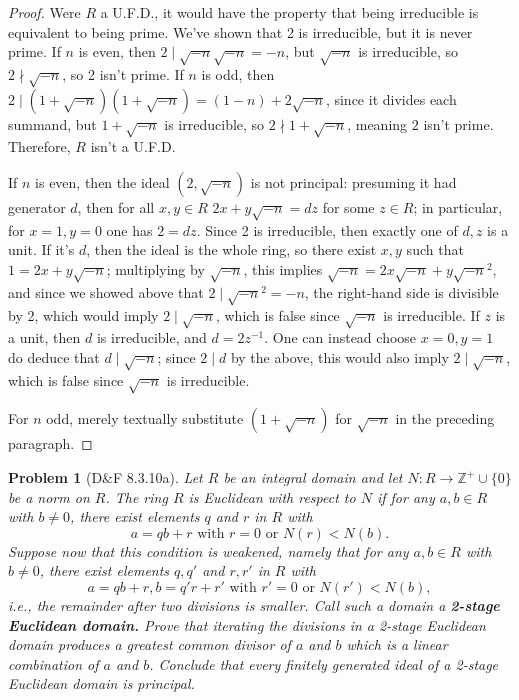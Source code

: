 \documentclass{article}
\newtheorem{plm}{Problem}
\begin{document}
\begin{proof}
  Were $R$ a U.F.D., it would have the property that being irreducible is equivalent to being prime.
  We've shown that 2 is irreducible, but it is never prime.
  If $n$ is even, then $2 \mid \sqrt{-n}\sqrt{-n} = -n$, but $\sqrt{-n}$ is irreducible, so $2 \nmid \sqrt{-n}$, so 2 isn't prime.
  If $n$ is odd, then $2 \mid (1 + \sqrt{-n})(1 + \sqrt{-n}) = (1 - n) + 2\sqrt{-n}$, since it divides each summand,
  but $1 + \sqrt{-n}$ is irreducible, so $2 \nmid 1 + \sqrt{-n}$, meaning $2$ isn't prime.
  Therefore, $R$ isn't a U.F.D.

  If $n$ is even, then
  the ideal $(2, \sqrt{-n})$ is not principal: presuming it had generator $d$, then for all $x, y \in R$ $2x + y\sqrt{-n} = dz$ for some $z \in R$;
  in particular, for $x = 1, y = 0$ one has $2 = dz$.
  Since 2 is irreducible, then exactly one of $d, z$ is a unit.
  If it's $d$, then the ideal is the whole ring, so there exist $x, y$ such that $1 = 2x + y\sqrt{-n}$; multiplying by $\sqrt{-n}$, this implies
  $\sqrt{-n} = 2x\sqrt{-n} + y \sqrt{-n}^{2}$, and since we showed above that $2 \mid \sqrt{-n}^{2} = -n$,
  the right-hand side is divisible by 2, which would imply $2 \mid \sqrt{-n}$, which is false since $\sqrt{-n}$ is  irreducible.
  If $z$ is a unit, then $d$ is irreducible, and $d = 2z^{-1}$.
  One can instead choose $x = 0, y = 1$ do deduce that $d \mid \sqrt{-n}$; since $2 \mid d$ by the above, this would also imply $2 \mid \sqrt{-n}$,
  which is false since $\sqrt{-n}$ is irreducible.

  For $n$ odd, merely textually substitute $(1 + \sqrt{-n})$ for $\sqrt{-n}$ in the preceding paragraph.
\end{proof}

\newpage

\begin{plm}[D\&F 8.3.10a]
  Let $R$ be an integral domain and let $N: R \to \mathbb{Z}^{+} \cup \{0\}$ be a norm on $R$.
  The ring $R$ is Euclidean with respect to $N$ if for any $a, b \in R$ with $b \neq 0$,
  there exist elements $q$ and $r$ in $R$ with
  \[
    a = qb + r \textrm{ with } r = 0 \textrm{ or } N(r) < N(b).
  \]
  Suppose now that this condition is weakened, namely that for any $a, b \in R$ with $b \neq 0$,
  there exist elements $q, q'$ and $r, r'$ in $R$ with
  \[
    a = qb + r, b = q'r + r' \textrm{ with } r' = 0 \textrm{ or } N(r') < N(b),
  \]
  i.e., the remainder after two divisions is smaller.
  Call such a domain a \textbf{2-stage Euclidean domain.}
  Prove that iterating the divisions in a 2-stage Euclidean domain produces a greatest common divisor
  of $a$ and $b$ which is a linear combination of $a$ and $b$.
  Conclude that every finitely generated ideal of a 2-stage Euclidean domain is principal.
\end{plm}
\end{document}
